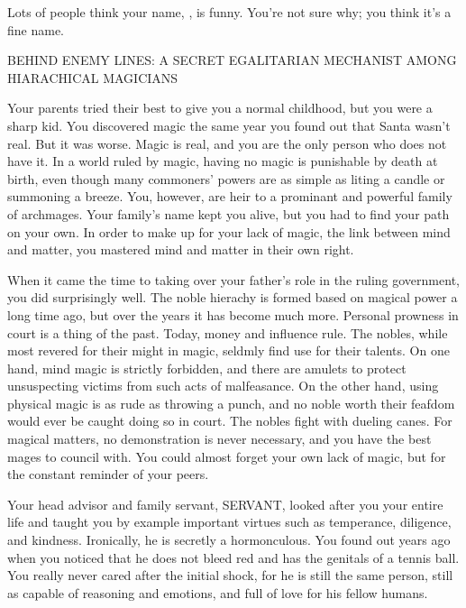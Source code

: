 \documentclass[char]{guildcamp3}
\begin{document}
Lots of people think your name, \me{\intro}, is funny.  You're not
sure why; you think it's a fine name.

BEHIND ENEMY LINES: A SECRET EGALITARIAN MECHANIST AMONG HIARACHICAL MAGICIANS

Your parents tried their best to give you a normal childhood, but you were a sharp kid. You discovered magic the same year you found out that Santa wasn't real. But it was worse. Magic is real, and you are the only person who does not have it. In a world ruled by magic, having no magic is punishable by death at birth, even though many commoners' powers are as simple as liting a candle or summoning a breeze. You, however, are heir to a prominant and powerful family of archmages. Your family's name kept you alive, but you had to find your path on your own. In order to make up for your lack of magic, the link between mind and matter, you mastered mind and matter in their own right.

When it came the time to taking over your father's role in the ruling government, you did surprisingly well. The noble hierachy is formed based on magical power a long time ago, but over the years it has become much more. Personal prowness in court is a thing of the past. Today, money and influence rule. The nobles, while most revered for their might in magic, seldmly find use for their talents. On one hand, mind magic is strictly forbidden, and there are amulets to protect unsuspecting victims from such acts of malfeasance. On the other hand, using physical magic is as rude as throwing a punch, and no noble worth their feafdom would ever be caught doing so in court. The nobles fight with dueling canes. For magical matters, no demonstration is never necessary, and you have the best mages to council with. You could almost forget your own lack of magic, but for the constant reminder of your peers.

Your head advisor and family servant, SERVANT, looked after you your entire life and taught you by example important virtues such as temperance, diligence, and kindness. Ironically, he is secretly a hormonculous. You found out years ago when you noticed that he does not bleed red and has the genitals of a tennis ball. You really never cared after the initial shock, for he is still the same person, still as capable of reasoning and emotions, and full of love for his fellow humans.
\end{document}
